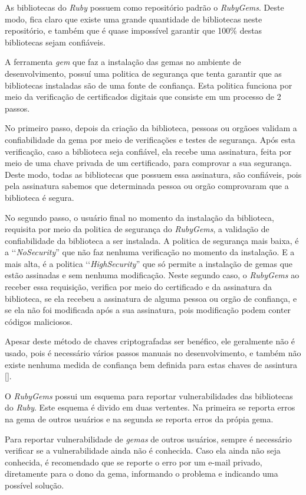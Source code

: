 As bibliotecas do \emph{Ruby} possuem como repositório padrão o \emph{RubyGems}. Deste modo, fica claro
que existe uma grande quantidade de bibliotecas neste repositório, e também que é quase impossível
garantir que 100\%  destas bibliotecas sejam confiáveis.

A ferramenta \emph{gem} que faz a instalação das gemas no ambiente de desenvolvimento, possuí uma politica
de segurança que tenta garantir que as bibliotecas instaladas são de uma fonte de confiança. Esta politica
funciona por meio da verificação de certificados digitais que consiste em um processo de 2 passos. 

No primeiro passo, depois da criação da biblioteca, pessoas ou orgãoes validam a confiabilidade da gema por
meio de verificações e testes de segurança. Após esta verificação, caso a biblioteca seja confiável, ela
recebe uma assinatura, feita por meio de uma chave privada de um certificado, para comprovar a sua segurança.
Deste modo, todas as bibliotecas que possuem essa assinatura, são confiáveis, pois pela assinatura sabemos
que determinada pessoa ou orgão comprovaram que a biblioteca é segura.

No segundo passo, o usuário final no momento da instalação da biblioteca, requisita por meio da politica
de segurança do \emph{RubyGems}, a validação de confiabilidade da biblioteca a ser instalada.
A politica de segurança mais baixa, é a ‘‘\emph{NoSecurity}'' que não faz nenhuma verificação no momento da
instalação. E a mais alta, é a politica ‘‘\emph{HighSecurity}'' que só permite a instalação de gemas que
estão assinadas e sem nenhuma modificação. Neste segundo caso, o \emph{RubyGems} ao receber essa
requisição, verifica por meio do certificado e da assinatura da biblioteca, se ela recebeu a assinatura
de alguma pessoa ou orgão de confiança, e se ela não foi modificada após a sua assinatura, pois 
modificação podem conter códigos maliciosos.

Apesar deste método de chaves criptografadas ser benéfico, ele geralmente não é usado, pois é necessário
vários passos manuais no desenvolvimento, e também não existe nenhuma medida de confiança bem definida
para estas chaves de assintura [].

O \emph{RubyGems} possui um esquema para reportar vulnerabilidades das bibliotecas do \emph{Ruby}.
Este esquema é divido em duas vertentes. Na primeira se reporta erros na gema de outros usuários e na
segunda se reporta erros da própia gema.

Para reportar vulnerabilidade de \emph{gemas} de outros usuários, sempre é necessário verificar
se a vulnerabilidade ainda não é conhecida. Caso ela ainda não seja conhecida, é recomendado que se
reporte o erro por um e-mail privado, diretamente para o dono da gema, informando o problema e
indicando uma possível solução.

